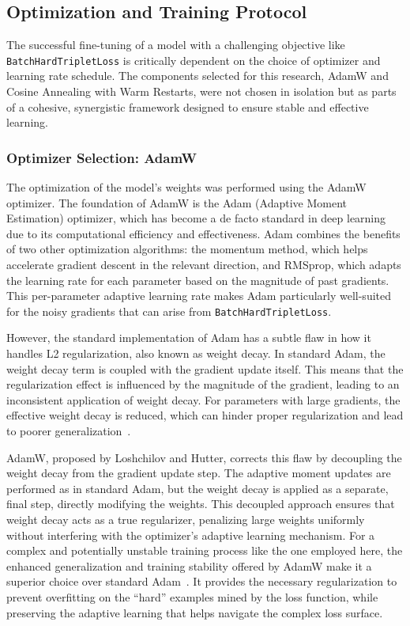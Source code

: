 \subsection{Optimization and Training Protocol}
The successful fine-tuning of a model with a challenging objective like \verb|BatchHardTripletLoss| is critically dependent on the choice of optimizer and learning rate schedule. The components selected for this research, AdamW and Cosine Annealing with Warm Restarts, were not chosen in isolation but as parts of a cohesive, synergistic framework designed to ensure stable and effective learning.

\subsubsection{Optimizer Selection: AdamW}
The optimization of the model's weights was performed using the AdamW optimizer. The foundation of AdamW is the Adam (Adaptive Moment Estimation) optimizer, which has become a de facto standard in deep learning due to its computational efficiency and effectiveness. Adam combines the benefits of two other optimization algorithms: the momentum method, which helps accelerate gradient descent in the relevant direction, and RMSprop, which adapts the learning rate for each parameter based on the magnitude of past gradients. This per-parameter adaptive learning rate makes Adam particularly well-suited for the noisy gradients that can arise from \verb|BatchHardTripletLoss|.

However, the standard implementation of Adam has a subtle flaw in how it handles L2 regularization, also known as weight decay. In standard Adam, the weight decay term is coupled with the gradient update itself. This means that the regularization effect is influenced by the magnitude of the gradient, leading to an inconsistent application of weight decay. For parameters with large gradients, the effective weight decay is reduced, which can hinder proper regularization and lead to poorer generalization~\cite{loshchilov2019decoupledweightdecayregularization}.

AdamW, proposed by Loshchilov and Hutter, corrects this flaw by decoupling the weight decay from the gradient update step. The adaptive moment updates are performed as in standard Adam, but the weight decay is applied as a separate, final step, directly modifying the weights. This decoupled approach ensures that weight decay acts as a true regularizer, penalizing large weights uniformly without interfering with the optimizer's adaptive learning mechanism. For a complex and potentially unstable training process like the one employed here, the enhanced generalization and training stability offered by AdamW make it a superior choice over standard Adam~\cite{loshchilov2019decoupledweightdecayregularization}. It provides the necessary regularization to prevent overfitting on the ``hard'' examples mined by the loss function, while preserving the adaptive learning that helps navigate the complex loss surface.

